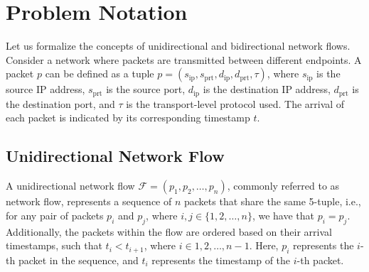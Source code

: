 \documentclass[lettersize,journal]{IEEEtran}
\begin{document}
{
    \small
    
     
}



\appendices
\section{Problem Notation}\label{sec:prob_notation}

Let us formalize the concepts of unidirectional and bidirectional network flows. Consider a network where packets are transmitted between different endpoints. A packet $p$ can be defined as a tuple $p = (s_{\text{ip}}, s_{\text{prt}}, d_{\text{ip}}, d_{\text{prt}}, \tau)$, where $s_{\text{ip}}$ is the source IP address, $s_{\text{prt}}$ is the source port, $d_{\text{ip}}$ is the destination IP address, $d_{\text{prt}}$ is the destination port, and $\tau$ is the transport-level protocol used. The arrival of each packet is indicated by its corresponding timestamp $t$.

\subsection{Unidirectional Network Flow}
A unidirectional network flow $\mathcal{F} = (p_1, p_2, \ldots, p_n)$, commonly referred to as network flow, represents a sequence of $n$ packets that share the same 5-tuple, i.e., for any pair of packets $p_i$ and $p_j$, where $i, j \in \{1, 2, \ldots, n\}$, we have that $p_i = p_j$. Additionally, the packets within the flow are ordered based on their arrival timestamps, such that $t_{i} < t_{i + 1}$, where $i \in {1,2,\ldots,n-1}$. Here, $p_i$ represents the $i$-th packet in the sequence, and $t_i$ represents the timestamp of the $i$-th packet. 
\end{document}
